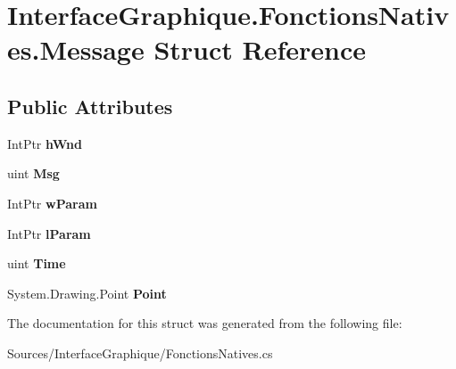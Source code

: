 \hypertarget{struct_interface_graphique_1_1_fonctions_natives_1_1_message}{}\section{Interface\+Graphique.\+Fonctions\+Natives.\+Message Struct Reference}
\label{struct_interface_graphique_1_1_fonctions_natives_1_1_message}
\subsection*{Public Attributes}
\begin{DoxyCompactItemize}
\item 
Int\+Ptr {\bfseries h\+Wnd}
\item 
uint {\bfseries Msg}
\item 
Int\+Ptr {\bfseries w\+Param}
\item 
Int\+Ptr {\bfseries l\+Param}
\item 
uint {\bfseries Time}
\item 
System.\+Drawing.\+Point {\bfseries Point}
\end{DoxyCompactItemize}


The documentation for this struct was generated from the following file\+:\begin{DoxyCompactItemize}
\item 
Sources/\+Interface\+Graphique/Fonctions\+Natives.\+cs\end{DoxyCompactItemize}
